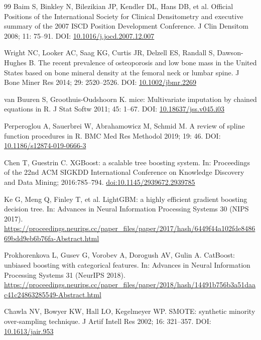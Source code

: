 \documentclass[11pt,a4paper]{article}
\begin{document}
\begin{thebibliography}{99}
 Baim S, Binkley N, Bilezikian JP, Kendler DL, Hans DB, et al. Official Positions of the International Society for Clinical Densitometry and executive summary of the 2007 ISCD Position Development Conference. J Clin Densitom 2008; 11: 75--91. DOI: \href{https://doi.org/10.1016/j.jocd.2007.12.007}{10.1016/j.jocd.2007.12.007}

 Wright NC, Looker AC, Saag KG, Curtis JR, Delzell ES, Randall S, Dawson-Hughes B. The recent prevalence of osteoporosis and low bone mass in the United States based on bone mineral density at the femoral neck or lumbar spine. J Bone Miner Res 2014; 29: 2520--2526. DOI: \href{https://doi.org/10.1002/jbmr.2269}{10.1002/jbmr.2269}

 van Buuren S, Groothuis-Oudshoorn K. mice: Multivariate imputation by chained equations in R. J Stat Softw 2011; 45: 1--67. DOI: \href{https://doi.org/10.18637/jss.v045.i03}{10.18637/jss.v045.i03}

 Perperoglou A, Sauerbrei W, Abrahamowicz M, Schmid M. A review of spline function procedures in R. BMC Med Res Methodol 2019; 19: 46. DOI: \href{https://doi.org/10.1186/s12874-019-0666-3}{10.1186/s12874-019-0666-3}

 Chen T, Guestrin C. XGBoost: a scalable tree boosting system. In: Proceedings of the 22nd ACM SIGKDD International Conference on Knowledge Discovery and Data Mining; 2016:785--794. \href{https://doi.org/10.1145/2939672.2939785}{doi:10.1145/2939672.2939785}

 Ke G, Meng Q, Finley T, et al. LightGBM: a highly efficient gradient boosting decision tree. In: Advances in Neural Information Processing Systems 30 (NIPS 2017). \url{https://proceedings.neurips.cc/paper_files/paper/2017/hash/6449f44a102fde848669bdd9eb6b76fa-Abstract.html}

 Prokhorenkova L, Gusev G, Vorobev A, Dorogush AV, Gulin A. CatBoost: unbiased boosting with categorical features. In: Advances in Neural Information Processing Systems 31 (NeurIPS 2018). \url{https://proceedings.neurips.cc/paper_files/paper/2018/hash/14491b756b3a51daac41c24863285549-Abstract.html}

 Chawla NV, Bowyer KW, Hall LO, Kegelmeyer WP. SMOTE: synthetic minority over-sampling technique. J Artif Intell Res 2002; 16: 321--357. DOI: \href{https://doi.org/10.1613/jair.953}{10.1613/jair.953}


\end{thebibliography}
\end{document}

